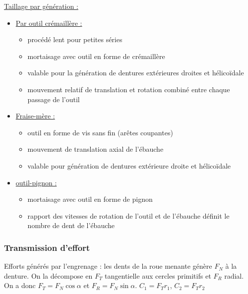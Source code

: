 \documentclass[../main.tex]{subfiles}
\begin{document}
\quad \underline{Taillage par génération :}\\
\begin{itemize}
    \item \underline{Par outil crémaillère :} \begin{itemize}
        \item procédé lent pour petites séries\\
        \item mortaisage avec outil en forme de crémaillère\\
        \item valable pour la génération de dentures extérieures droites et hélicoïdale\\
        \item mouvement relatif de translation et rotation combiné entre chaque passage de l'outil\\
    \end{itemize}
    \item \underline{Fraise-mère :} \begin{itemize}
        \item outil en forme de vis sans fin (arêtes coupantes)\\
        \item mouvement de translation axial de l'ébauche\\
        \item valable pour génération de dentures extérieure droite et hélicoïdale\\
    \end{itemize}
    \item \underline{outil-pignon :}\begin{itemize}
        \item mortaisage avec outil en forme de pignon\\
        \item rapport des vitesses de rotation de l'outil et de l'ébauche définit le nombre de dent de l'ébauche\\
    \end{itemize}
\end{itemize}

\subsubsection{Transmission d'effort}
Efforts générés par l'engrenage : les dents de la roue menante génère $F_N$ à la denture. On la décompose en $F_T$ tangentielle aux cercles primitifs et $F_R$ radial.\\
On a donc $F_T = F_N \cos{\alpha}$ et $F_R = F_N \sin{\alpha}$. $C_1 = F_T r_1$, $C_2 = F_T r_2$\\
\end{document}
